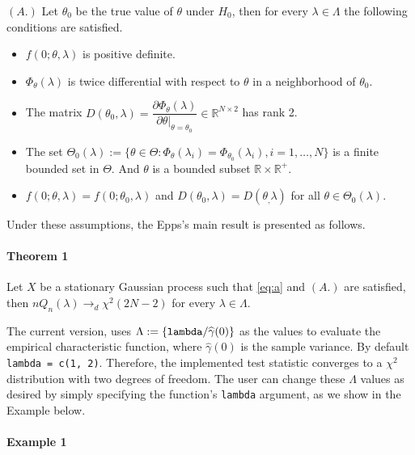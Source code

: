 \((A.)\) Let \(\theta_0\) be the true value of \(\theta\) under \(H_0\), then for every \(\lambda \in \Lambda\) the following conditions are satisfied.

\begin{itemize}
\item
  \(f(0;\theta,\lambda)\) is positive definite.
\item
  \(\Phi_\theta(\lambda)\) is twice differential with respect to \(\theta\) in a neighborhood of \(\theta_0\).
\item
  The matrix \(D(\theta_0,\lambda) = \dfrac{\partial \Phi_\theta(\lambda)}{\partial\theta |_{\theta = \theta_0}} \in \mathbb{R}^{N\times 2}\) has rank 2.
\item
  The set \(\Theta_0(\lambda) := \{ \theta \in \Theta:  \Phi_\theta(\lambda_i) =  \Phi_{\theta_0}(\lambda_i), i=1, \ldots,N\}\) is a finite bounded set in \(\Theta\). And \(\theta\) is a bounded subset \(\mathbb{R}\times \mathbb{R}^+\).
\item
  \(f(0;\theta,\lambda) = f(0;\theta_0,\lambda)\) and \(D(\theta_0,\lambda) = D(\theta_,\lambda)\) for all \(\theta \in \Theta_0(\lambda)\).
\end{itemize}

Under these assumptions, the Epps's main result is presented as follows.

\paragraph{\texorpdfstring{Theorem 1 \citep[Theorem 2.1]{epps1987}}{Theorem 1 {[}@epps1987, Theorem 2.1{]}}}\label{theorem-1-epps1987-theorem-2.1}

Let \(X\) be a stationary Gaussian process such that \eqref{eq:a} and \((A.)\) are satisfied, then \(nQ_n(\lambda)\to_d \chi^2(2N - 2)\) for every \(\lambda \in \Lambda\).

The current  version, uses \(\Lambda := \{\verb|lambda|/\widehat{\gamma}(0)\}\) as the values to evaluate the empirical characteristic function, where \(\widehat{\gamma}(0)\) is the sample variance. By default \texttt{lambda\ =\ c(1,\ 2)}. Therefore, the implemented test statistic converges to a \(\chi^2\) distribution with two degrees of freedom. The user can change these \(\Lambda\) values as desired by simply specifying the function's \texttt{lambda} argument, as we show in the Example below.

\paragraph{Example 1}\label{example-1}

